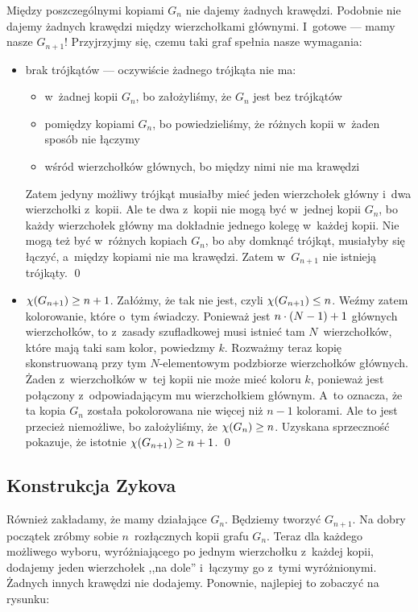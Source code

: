         Między poszczególnymi kopiami $G_n$ nie dajemy żadnych krawędzi. Podobnie nie dajemy żadnych krawędzi między wierzchołkami głównymi. I~gotowe --- mamy nasze $G_{n + 1}$! Przyjrzyjmy się, czemu taki graf spełnia nasze wymagania:
        \begin{itemize}
            \item brak trójkątów --- oczywiście żadnego trójkąta nie ma:
                \begin{itemize}
                    \item w~żadnej kopii $G_n$, bo założyliśmy, że $G_n$ jest bez trójkątów
                    \item pomiędzy kopiami $G_n$, bo powiedzieliśmy, że różnych kopii w~żaden sposób nie łączymy
                    \item wśród wierzchołków głównych, bo między nimi nie ma krawędzi
                \end{itemize}
                Zatem jedyny możliwy trójkąt musiałby mieć jeden wierzchołek główny i~dwa wierzchołki z~kopii. Ale te dwa z~kopii nie mogą być w~jednej kopii $G_n$, bo każdy wierzchołek główny ma dokładnie jednego kolegę w~każdej kopii. Nie mogą też być w~różnych kopiach $G_n$, bo aby domknąć trójkąt, musiałyby się łączyć, a~między kopiami nie ma krawędzi. Zatem w~$G_{n + 1}$ nie istnieją trójkąty.
                \qed
            \item $\chi\pars{G_{n + 1}} \geq n + 1$. Załóżmy, że tak nie jest, czyli $\chi\pars{G_{n + 1}} \leq n$. Weźmy zatem kolorowanie, które o~tym świadczy. Ponieważ jest $n \cdot \left(N - 1\right) + 1$ głównych wierzchołków, to z~zasady szufladkowej musi istnieć tam $N$~wierzchołków, które mają taki sam kolor, powiedzmy $k$. Rozważmy teraz kopię skonstruowaną przy tym $N$-elementowym podzbiorze wierzchołków głównych. Żaden z~wierzchołków w~tej kopii nie może mieć koloru $k$, ponieważ jest połączony z~odpowiadającym mu wierzchołkiem głównym. A~to oznacza, że ta kopia $G_n$ została pokolorowana nie więcej niż $n - 1$ kolorami. Ale to jest przecież niemożliwe, bo założyliśmy, że $\chi\pars{G_n} \geq n$. Uzyskana sprzeczność pokazuje, że istotnie $\chi\pars{G_{n + 1}} \geq n + 1$.
            \qed
        \end{itemize}
    
    \subsection{Konstrukcja Zykova}
        Również zakładamy, że mamy działające $G_n$. Będziemy tworzyć $G_{n + 1}$. Na dobry początek zróbmy sobie $n$~rozłącznych kopii grafu $G_n$. Teraz dla każdego możliwego wyboru, wyróżniającego po jednym wierzchołku z~każdej kopii, dodajemy jeden wierzchołek ,,na dole'' i~łączymy go z~tymi wyróżnionymi. Żadnych innych krawędzi nie dodajemy. Ponownie, najlepiej to zobaczyć na rysunku:
        
